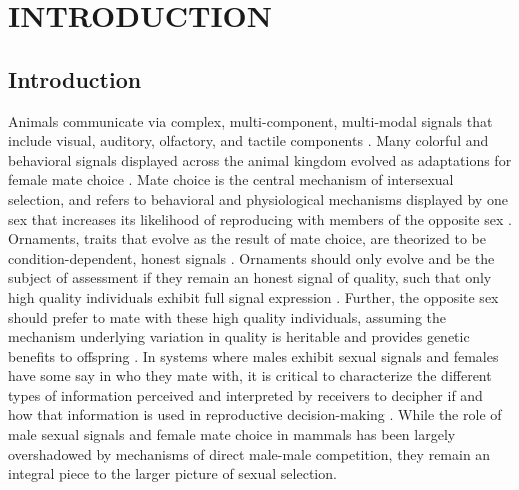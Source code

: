 \chapter{INTRODUCTION}
\label{INTRODUCTION}
\section{Introduction}\label{introduction}

Animals communicate via complex, multi-component, multi-modal signals that include visual, auditory, olfactory, and tactile components \parencite{fröhlichFunctionPrimateMultimodal2018}. Many colorful and behavioral signals displayed across the animal kingdom evolved as adaptations for female mate choice \parencite{anderssonFemaleChoiceSelects1982,darwinSexualSelectionDescent1871,hillBirdColorationFunction2006}. Mate choice is the central mechanism of intersexual selection, and refers to behavioral and physiological mechanisms displayed by one sex that increases its likelihood of reproducing with members of the opposite sex \parencite{anderssonSexualSelection1994}. Ornaments, traits that evolve as the result of mate choice, are theorized to be condition-dependent, honest signals \parencite{clutton-brockRoaringRedDeer1979,hamiltonHeritableTrueFitness1982,hillPlumageColorationSexually1991,somjeeHiddenCostSexually2018,tibbettsEvolutionHonestCommunication2014}. Ornaments should only evolve and be the subject of assessment if they remain an honest signal of quality, such that only high quality individuals exhibit full signal expression \parencite{heywoodSexualSelectionHandicap1989,somjeeHiddenCostSexually2018,tibbettsEvolutionHonestCommunication2014,weaverWhatMaintainsSignal2017,zahaviMateSelectionSelection1975}. Further, the opposite sex should prefer to mate with these high quality individuals, assuming the mechanism underlying variation in quality is heritable and provides genetic benefits to offspring \parencite{anderssonSexualSelection1994,vonschantzGoodGenesOxidative1999,zahaviMateSelectionSelection1975}. In systems where males exhibit sexual signals and females have some say in who they mate with, it is critical to characterize the different types of information perceived and interpreted by receivers to decipher if and how that information is used in reproductive decision-making \parencite{highamIntroductionMultimodalCommunication2013}. While the role of male sexual signals and female mate choice in mammals has been largely overshadowed by mechanisms of direct male-male competition, they remain an integral piece to the larger picture of sexual selection.